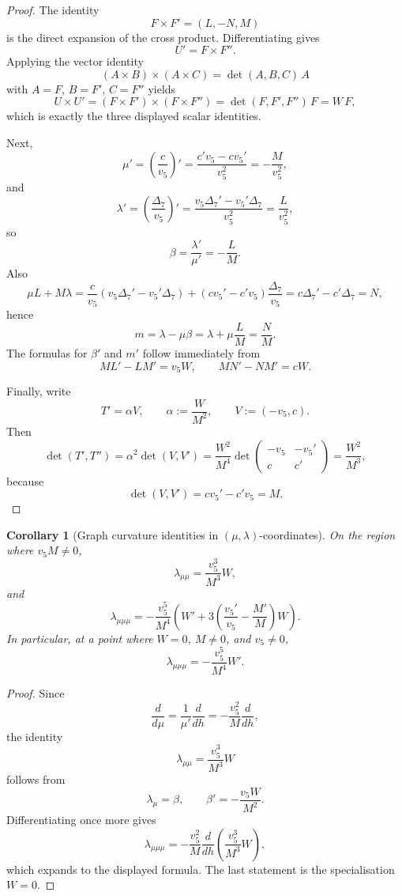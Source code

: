\documentclass[11pt,a4paper]{amsart}
\theoremstyle{plain}
\newtheorem{corollary}[theorem]{Corollary}
\theoremstyle{definition}
\begin{document}
\begin{proof}
The identity
\[
F\times F'=(L,-N,M)
\]
is the direct expansion of the cross product. Differentiating gives
\[
U'=F\times F''.
\]
Applying the vector identity
\[
(A\times B)\times(A\times C)=\det(A,B,C)\,A
\]
with $A=F$, $B=F'$, $C=F''$ yields
\[
U\times U'=(F\times F')\times(F\times F'')=\det(F,F',F'')\,F=W\,F,
\]
which is exactly the three displayed scalar identities.

Next,
\[
\mu'=\left(\frac{c}{v_5}\right)'
=\frac{c'v_5-cv_5'}{v_5^2}
=-\frac{M}{v_5^2},
\]
and
\[
\lambda'=\left(\frac{\Delta_7}{v_5}\right)'
=\frac{v_5\Delta_7'-v_5'\Delta_7}{v_5^2}
=\frac{L}{v_5^2},
\]
so
\[
\beta=\frac{\lambda'}{\mu'}=-\frac{L}{M}.
\]
Also
\[
\mu L+M\lambda
=
\frac{c}{v_5}(v_5\Delta_7'-v_5'\Delta_7)
+
(cv_5'-c'v_5)\frac{\Delta_7}{v_5}
=
c\Delta_7'-c'\Delta_7
=
N,
\]
hence
\[
m=\lambda-\mu\beta=\lambda+\mu\frac{L}{M}=\frac{N}{M}.
\]
The formulas for $\beta'$ and $m'$ follow immediately from
\[
ML'-LM'=v_5W,
\qquad
MN'-NM'=cW.
\]

Finally, write
\[
T'=\alpha V,
\qquad
\alpha:=\frac{W}{M^2},
\qquad
V:=(-v_5,c).
\]
Then
\[
\det(T',T'')=\alpha^2\det(V,V')
=\frac{W^2}{M^4}\det\!\begin{pmatrix}
-v_5 & -v_5'\\
c & c'
\end{pmatrix}
=
\frac{W^2}{M^3},
\]
because
\[
\det(V,V')=cv_5'-c'v_5=M.
\]
\end{proof}

\begin{corollary}[Graph curvature identities in $(\mu,\lambda)$-coordinates]
\label{cor:mu-lambda-curvature-identities}
On the region where $v_5M\neq 0$,
\[
\lambda_{\mu\mu}=\frac{v_5^3}{M^3}W,
\]
and
\[
\lambda_{\mu\mu\mu}
=
-\frac{v_5^5}{M^4}
\left(
W'+3\left(\frac{v_5'}{v_5}-\frac{M'}{M}\right)W
\right).
\]
In particular, at a point where $W=0$, $M\neq 0$, and $v_5\neq 0$,
\[
\lambda_{\mu\mu\mu}
=
-\frac{v_5^5}{M^4}W'.
\]
\end{corollary}

\begin{proof}
Since
\[
\frac{d}{d\mu}=\frac{1}{\mu'}\frac{d}{dh}
=
-\frac{v_5^2}{M}\frac{d}{dh},
\]
the identity
\[
\lambda_{\mu\mu}=\frac{v_5^3}{M^3}W
\]
follows from
\[
\lambda_\mu=\beta,
\qquad
\beta'=-\frac{v_5W}{M^2}.
\]
Differentiating once more gives
\[
\lambda_{\mu\mu\mu}
=
-\frac{v_5^2}{M}\frac{d}{dh}\!\left(\frac{v_5^3}{M^3}W\right),
\]
which expands to the displayed formula. The last statement is the specialisation
$W=0$.
\end{proof}
\end{document}
